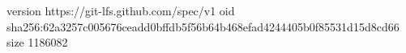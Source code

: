 version https://git-lfs.github.com/spec/v1
oid sha256:62a3257c005676ceadd0bffdb5f56b64b468efad4244405b0f85531d15d8cd66
size 1186082
